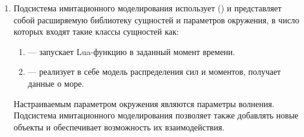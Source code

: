 \begin{enumerate}
	\item
	Подсистема имитационного моделирования использует () и
	представляет собой расширяемую библиотеку сущностей и параметров окружения, 
	в число которых входят такие классы сущностей как:
	\begin{enumerate}
		\item	{} --- запускает Lua-функцию в заданный момент времени.
		\item	{} --- реализует в себе модель распределения сил 
				и моментов, получает данные о море.
	\end{enumerate}
	Настраиваемым параметром окружения являются параметры волнения.
	Подсистема имитационного моделирования позволяет также добавлять 
			новые объекты и обеспечивает возможность их взаимодействия.
\end{enumerate}


